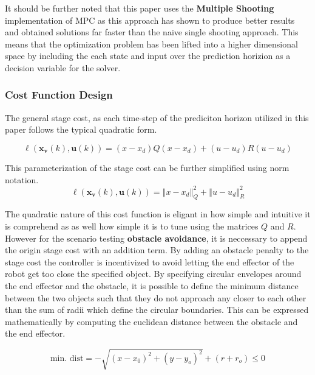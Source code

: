 \documentclass[journal]{IEEEtran}
\begin{document}
It should be further noted that this paper uses the \textbf{Multiple Shooting} implementation of MPC as this approach has shown to produce better results and obtained solutions far faster than the naive single shooting approach. This means that the optimization problem has been lifted into a higher dimensional space by including the each state and input over the prediction horizion as a decision variable for the solver. \\

\subsubsection{Cost Function Design}

The general stage cost, as each time-step of the prediciton horizon utilized in this paper follows the typical quadratic form.

\begin{equation}
  \ell\left(\mathbf{x}_{\mathbf{v}}(k), \mathbf{u}(k)\right) = (x-x_d)Q(x-x_d) + (u-u_d)R(u-u_d)
\end{equation}

This parameterization of the stage cost can be further simplified using norm notation.
\begin{equation}\label{eq:norm_cost}
  \ell\left(\mathbf{x}_{\mathbf{v}}(k), \mathbf{u}(k)\right) = \left\Vert x - x_d \right\Vert^{2}_{Q} + \left\Vert u -u_d \right\Vert^{2}_{R}
\end{equation}

The quadratic nature of this cost function is eligant in how simple and intuitive it is comprehend as as well how simple it is to tune using the matrices $Q$ and $R$. \\

However for the scenario testing \textbf{obstacle avoidance}, it is neccessary to append the origin stage cost with an addition term. By adding an obstacle penalty to the stage cost the controller is incentivized to avoid letting the end effector of the robot get too close the specified object. By specifying circular envelopes around the end effector and the obstacle, it is possible to define the minimum distance between the two objects such that they do not approach any closer to each other than the sum of radii which define the circular boundaries. This can be expressed mathematically by computing the euclidean distance between the obstacle and the end effector.

\begin{equation}
\text{min. dist} = -\sqrt{\left(x-x_{0}\right)^{2}+\left(y-y_{o}\right)^{2}}+\left(r+r_{o}\right) \leq 0
\end{equation}
\end{document}
